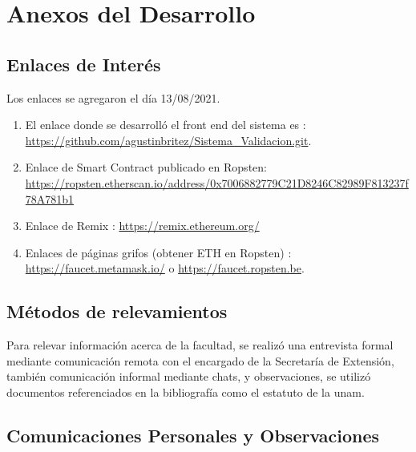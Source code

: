 \appendix


\chapter{Anexos del Desarrollo}\label{ac:desarrollo}
\newpage
\section{Enlaces de Interés}
Los enlaces se agregaron el día 13/08/2021.
\begin{enumerate}
    \item El enlace donde se desarrolló el front end del sistema es : \url{https://github.com/agustinbritez/Sistema_Validacion.git}.
    \item Enlace de Smart Contract publicado en Ropsten: \url{https://ropsten.etherscan.io/address/0x7006882779C21D8246C82989F813237f78A781b1}
    \item Enlace de Remix : \url{https://remix.ethereum.org/}
    \item Enlaces de páginas grifos (obtener ETH en Ropsten) : \url{https://faucet.metamask.io/} o \url{https://faucet.ropsten.be}.
\end{enumerate}

\section{Métodos de relevamientos}

Para relevar información acerca de la facultad, se realizó una entrevista formal mediante comunicación remota  con el encargado de la Secretaría de Extensión, también comunicación informal mediante
chats, y observaciones, se utilizó documentos referenciados en la bibliografía como el estatuto de la \gls{unam}.

% 
% 

\section{Comunicaciones Personales y Observaciones}

